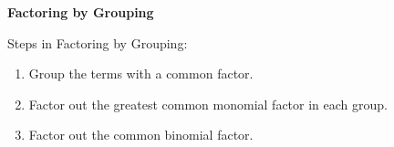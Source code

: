 \begin{center}
\textbf{Factoring by Grouping}
\end{center}

\vspace*{1ex}

Steps in Factoring by Grouping: 

\begin{enumerate}
\item Group the terms with a common factor.
\item Factor out the greatest common monomial factor in each group.
\item Factor out the common  binomial factor. 

\end{enumerate}